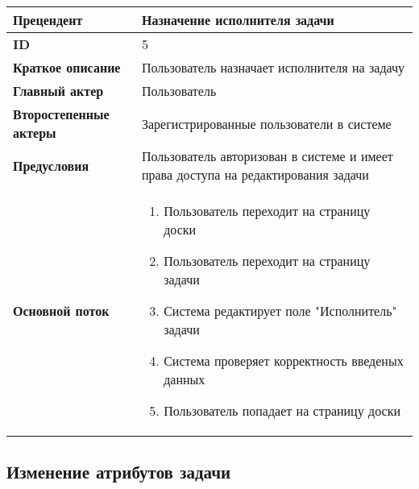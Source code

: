 \documentclass[14pt,a4paper]{extarticle}
\begin{document}
\begin{tabular}{|l|p{9cm}|}
	\hline
	\textbf{Прецендент}            & Назначение исполнителя задачи                                                     \\
	\hline
	\textbf{ID}                    & 5                                                                                 \\
	\hline
	\textbf{Краткое описание}      & Пользователь назначает исполнителя на задачу                                      \\
	\hline
	\textbf{Главный актер}         & Пользователь                                                                      \\
	\hline
	\textbf{Второстепенные актеры} & Зарегистрированные пользователи в системе                                         \\
	\hline
	\textbf{Предусловия}           & Пользователь авторизован в системе и имеет права доступа на редактирования задачи \\
	\hline
	\textbf{Основной поток}        & \begin{enumerate}
		                                 \item Пользователь переходит на страницу доски
		                                 \item Пользователь переходит на страницу задачи
		                                 \item Система редактирует поле "Исполнитель" задачи
		                                 \item Система проверяет корректность введеных данных
		                                 \item Пользователь попадает на страницу доски
	                                 \end{enumerate}                               \\
	\hline
\end{tabular}

\subsection{Изменение атрибутов задачи}
\end{document}
